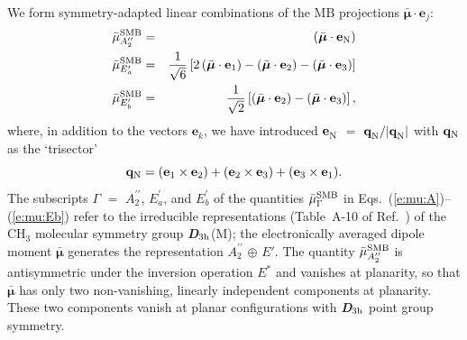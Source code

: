 \documentclass{achemso}
\newcommand{\3}{$_{3}$}
\newcommand{\p}{^\prime}
\newcommand{\pp}{^{\prime\prime}}
\begin{document}
We form                                           symmetry-adapted
linear combinations of the MB projections $ \bar{\bm{\mu}} \cdot
\mathbf{e}_j $:
\begin{eqnarray}
\label{e:mu:A}
  \bar\mu_{A_2\pp}^{\rm SMB}&=& \left( \bar{\bm{\mu}} \cdot \mathbf{e}_{\rm N} \right) \\
\label{e:mu:Ea}
  \bar\mu_{E_a\p}^{\rm SMB} &=& \frac{1}{\sqrt{6}} \left[ 2 \left( \bar{\bm{\mu}} \cdot \mathbf{e}_1 \right) - \left( \bar{\bm{\mu}} \cdot \mathbf{e}_2 \right) - \left( \bar{\bm{\mu}} \cdot \mathbf{e}_3 \right) \right] \\
\label{e:mu:Eb}
  \bar\mu_{E_b\p}^{\rm SMB} &=& \frac{1}{\sqrt{2}} \left[                                                \left( \bar{\bm{\mu}} \cdot \mathbf{e}_2 \right) - \left( \bar{\bm{\mu}} \cdot \mathbf{e}_3 \right) \right],
\end{eqnarray}
where, in addition to the vectors
   $\mathbf{e}_k$,
 we have introduced
$\mathbf{e}_{\rm N}^{}$ $=$ $\mathbf{q}_{\rm N}^{}/\vert
\mathbf{q}_{\rm N}^{}\vert$ with
$\mathbf{q}_{\rm N}$ as
 the `trisector'
\begin{equation}
\label{e:q-N}
    \mathbf{q}_{\rm N} =
      (\mathbf{e}_1 \times \mathbf{e}_2)
    + (\mathbf{e}_2 \times \mathbf{e}_3)
    + (\mathbf{e}_3 \times \mathbf{e}_1).
\end{equation}
The
subscripts
$\Gamma$ $=$
$A_2\pp$, $E_a\p$, and $E_b\p$
of the quantities $\bar\mu_{\Gamma}^{\rm SMB}$
in Eqs.~(\ref{e:mu:A})--(\ref{e:mu:Eb}) refer to
the irreducible representations
 (Table~A-10 of Ref.~)
of the CH$_3$ molecular symmetry group
{\itshape\bfseries D}$_{3{\rm h}}$(M);
the electronically averaged dipole moment
$ \bar{\bm{\mu}}$ generates the representation
$A_2 \pp$ $\oplus$ $E'$.
 The quantity $\bar\mu_{A_2\pp}^{\rm SMB}$ is
antisymmetric under the inversion operation\cite{mss} $E^*$ and vanishes
at planarity, so that
$ \bar{\bm{\mu}}$ has only two non-vanishing, linearly independent components
at planarity. These two components vanish at planar configurations with
{\itshape\bfseries D}$_{3{\rm h}}$ point group symmetry.
\end{document}
